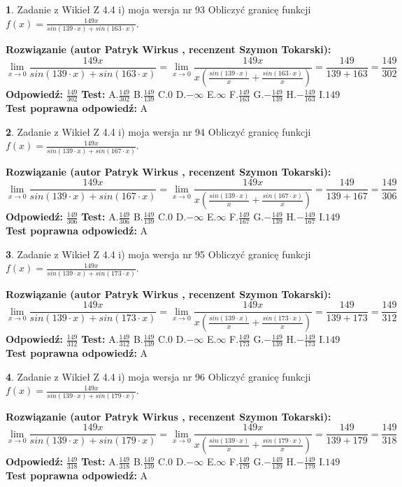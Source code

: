 \documentclass[12pt, a4paper]{article}
\theoremstyle{definition} %
\newtheorem{zad}{}
\newcommand{\zadStart}[1]{\begin{zad}#1\newline}
\newcommand{\zadStop}{\end{zad}}
\newcommand{\rozwStart}[2]{\noindent \textbf{Rozwiązanie (autor #1 , recenzent #2): }\newline}
\newcommand{\rozwStop}{\newline}
\newcommand{\odpStart}{\noindent \textbf{Odpowiedź:}\newline}
\newcommand{\odpStop}{\newline}
\newcommand{\testStart}{\noindent \textbf{Test:}\newline}
\newcommand{\testStop}{\newline}
\newcommand{\kluczStart}{\noindent \textbf{Test poprawna odpowiedź:}\newline}
\newcommand{\kluczStop}{\newline}
\begin{document}
\zadStart{Zadanie z Wikieł Z 4.4 i) moja wersja nr 93}
Obliczyć granicę funkcji $f(x)=\frac{149x}{sin(139\cdot x) +sin(163\cdot x)}$.
\zadStop
\rozwStart{Patryk Wirkus}{Szymon Tokarski}
$$\lim\limits_{x\to 0}\frac{149x}{sin(139\cdot x) +sin(163\cdot x)}=\lim\limits_{x\to 0}\frac{149x}{x(\frac{sin(139\cdot x)}{x}+\frac{sin(163\cdot x)}{x})}=\frac{149}{139+163} = \frac{149}{302}$$
\rozwStop
\odpStart
$\frac{149}{302}$
\odpStop
\testStart
A.$\frac{149}{302}$
B.$\frac{149}{139}$
C.$0$
D.$-\infty$
E.$\infty$
F.$\frac{149}{163}$
G.$-\frac{149}{139}$
H.$-\frac{149}{163}$
I.$149$
\testStop
\kluczStart
A
\kluczStop



\zadStart{Zadanie z Wikieł Z 4.4 i) moja wersja nr 94}
Obliczyć granicę funkcji $f(x)=\frac{149x}{sin(139\cdot x) +sin(167\cdot x)}$.
\zadStop
\rozwStart{Patryk Wirkus}{Szymon Tokarski}
$$\lim\limits_{x\to 0}\frac{149x}{sin(139\cdot x) +sin(167\cdot x)}=\lim\limits_{x\to 0}\frac{149x}{x(\frac{sin(139\cdot x)}{x}+\frac{sin(167\cdot x)}{x})}=\frac{149}{139+167} = \frac{149}{306}$$
\rozwStop
\odpStart
$\frac{149}{306}$
\odpStop
\testStart
A.$\frac{149}{306}$
B.$\frac{149}{139}$
C.$0$
D.$-\infty$
E.$\infty$
F.$\frac{149}{167}$
G.$-\frac{149}{139}$
H.$-\frac{149}{167}$
I.$149$
\testStop
\kluczStart
A
\kluczStop



\zadStart{Zadanie z Wikieł Z 4.4 i) moja wersja nr 95}
Obliczyć granicę funkcji $f(x)=\frac{149x}{sin(139\cdot x) +sin(173\cdot x)}$.
\zadStop
\rozwStart{Patryk Wirkus}{Szymon Tokarski}
$$\lim\limits_{x\to 0}\frac{149x}{sin(139\cdot x) +sin(173\cdot x)}=\lim\limits_{x\to 0}\frac{149x}{x(\frac{sin(139\cdot x)}{x}+\frac{sin(173\cdot x)}{x})}=\frac{149}{139+173} = \frac{149}{312}$$
\rozwStop
\odpStart
$\frac{149}{312}$
\odpStop
\testStart
A.$\frac{149}{312}$
B.$\frac{149}{139}$
C.$0$
D.$-\infty$
E.$\infty$
F.$\frac{149}{173}$
G.$-\frac{149}{139}$
H.$-\frac{149}{173}$
I.$149$
\testStop
\kluczStart
A
\kluczStop



\zadStart{Zadanie z Wikieł Z 4.4 i) moja wersja nr 96}
Obliczyć granicę funkcji $f(x)=\frac{149x}{sin(139\cdot x) +sin(179\cdot x)}$.
\zadStop
\rozwStart{Patryk Wirkus}{Szymon Tokarski}
$$\lim\limits_{x\to 0}\frac{149x}{sin(139\cdot x) +sin(179\cdot x)}=\lim\limits_{x\to 0}\frac{149x}{x(\frac{sin(139\cdot x)}{x}+\frac{sin(179\cdot x)}{x})}=\frac{149}{139+179} = \frac{149}{318}$$
\rozwStop
\odpStart
$\frac{149}{318}$
\odpStop
\testStart
A.$\frac{149}{318}$
B.$\frac{149}{139}$
C.$0$
D.$-\infty$
E.$\infty$
F.$\frac{149}{179}$
G.$-\frac{149}{139}$
H.$-\frac{149}{179}$
I.$149$
\testStop
\kluczStart
A
\kluczStop
\end{document}
